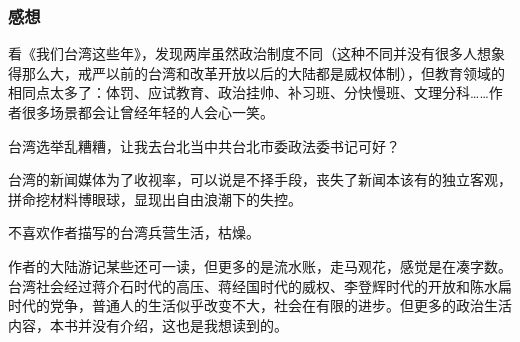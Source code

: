 \subsubsection{感想}

看《我们台湾这些年》，发现两岸虽然政治制度不同（这种不同并没有很多人想象得那么大，戒严以前的台湾和改革开放以后的大陆都是威权体制），但教育领域的相同点太多了：体罚、应试教育、政治挂帅、补习班、分快慢班、文理分科……作者很多场景都会让曾经年轻的人会心一笑。

台湾选举乱糟糟，让我去台北当中共台北市委政法委书记可好？

台湾的新闻媒体为了收视率，可以说是不择手段，丧失了新闻本该有的独立客观，拼命挖材料博眼球，显现出自由浪潮下的失控。

不喜欢作者描写的台湾兵营生活，枯燥。

作者的大陆游记某些还可一读，但更多的是流水账，走马观花，感觉是在凑字数。
台湾社会经过蒋介石时代的高压、蒋经国时代的威权、李登辉时代的开放和陈水扁时代的党争，普通人的生活似乎改变不大，社会在有限的进步。但更多的政治生活内容，本书并没有介绍，这也是我想读到的。